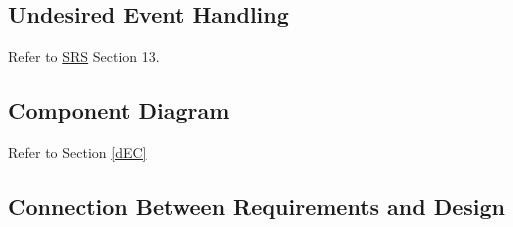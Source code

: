 \documentclass[12pt, titlepage]{article}
\begin{document}
\subsection{Undesired Event Handling}

Refer to \href{https://github.com/zakerl/Capstone_Project/blob/main/docs/SRS/SRS.pdf}{SRS} Section 13.

\subsection{Component Diagram}

Refer to Section \ref{dEC}

\subsection{Connection Between Requirements and Design} \label{SecConnection}
\end{document}
